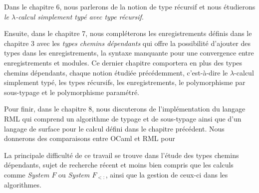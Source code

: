 Dans le chapitre 6, nous parlerons de la notion de type récursif et nous
étudierons \textit{le $\lambda$-calcul simplement typé avec type récursif}.

Ensuite, dans le chapitre 7, nous compléterons les enregistrements définis
dans le chapitre 3 avec les \textit{types chemins dépendants} qui offre la possibilité
d'ajouter des types dans les enregistrements, la syntaxe manquante pour une
convergence entre enregistrements et modules. Ce dernier chapitre comportera en
plus des types chemins dépendants, chaque notion étudiée précédemment,
c'est-à-dire le $\lambda$-calcul simplement typé, les types récursifs, les
enregistrements, le polymorphisme par sous-typage et le polymorphisme paramétré.

Pour finir, dans le chapitre 8, nous discuterons de l'implémentation du langage
RML\cite{rml-github} qui comprend un algorithme de typage et de sous-typage ainsi que d'un langage de surface pour le
calcul défini dans le chapitre précédent. Nous donnerons des comparaisons entre
OCaml et RML pour


La principale difficulté de ce travail se trouve dans l'étude des types
chemins dépendants, sujet de recherche récent et moins bien compris que les
calculs comme \textit{System $F$} ou \textit{System $F_{<:}$}, ainsi que
la gestion de ceux-ci dans les algorithmes.
